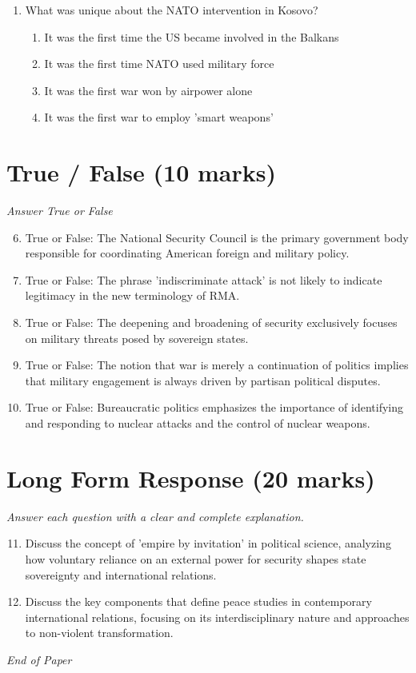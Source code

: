 \documentclass[12pt]{article}
\begin{document}
\begin{enumerate}[label=\arabic*.]
\begin{enumerate}[label=(\alph*)]
    \item British preoccupation with Europe
    \item All of the above
\end{enumerate}
\item What was unique about the NATO intervention in Kosovo?
\begin{enumerate}[label=(\alph*)]
    \item It was the first time the US became involved in the Balkans
    \item It was the first time NATO used military force
    \item It was the first war won by airpower alone
    \item It was the first war to employ 'smart weapons'
\end{enumerate}
\end{enumerate}

\section*{True / False (10 marks)}
\textit{Answer True or False}
\begin{enumerate}[label=\arabic*.]
\setcounter{enumi}{5}
\item True or False: The National Security Council is the primary government body responsible for coordinating American foreign and military policy.
\item True or False: The phrase 'indiscriminate attack' is not likely to indicate legitimacy in the new terminology of RMA.
\item True or False: The deepening and broadening of security exclusively focuses on military threats posed by sovereign states.
\item True or False: The notion that war is merely a continuation of politics implies that military engagement is always driven by partisan political disputes.
\item True or False: Bureaucratic politics emphasizes the importance of identifying and responding to nuclear attacks and the control of nuclear weapons.
\end{enumerate}

\section*{Long Form Response (20 marks)}
\textit{Answer each question with a clear and complete explanation.}
\begin{enumerate}[label=\arabic*.]
\setcounter{enumi}{10}
\item Discuss the concept of 'empire by invitation' in political science, analyzing how voluntary reliance on an external power for security shapes state sovereignty and international relations.
\item Discuss the key components that define peace studies in contemporary international relations, focusing on its interdisciplinary nature and approaches to non-violent transformation.
\end{enumerate}

\vfill
\noindent\textit{End of Paper}
\end{document}
